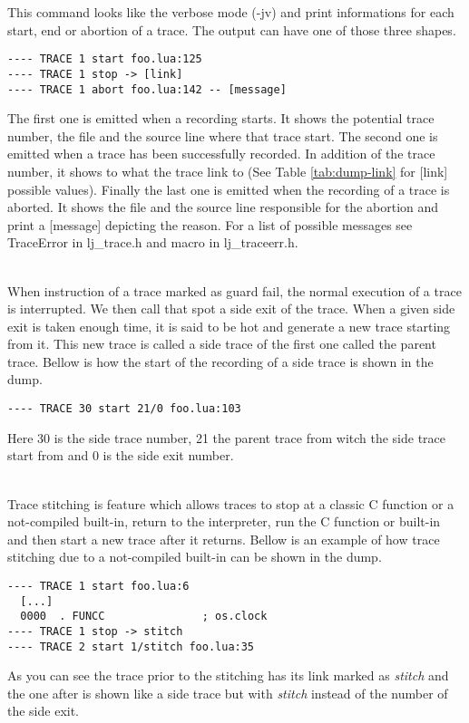 This command looks like the verbose mode (-jv) and print informations for each start,
end or abortion of a trace. The output can have one of those three shapes.
\begin{verbatim}
---- TRACE 1 start foo.lua:125
---- TRACE 1 stop -> [link]
---- TRACE 1 abort foo.lua:142 -- [message]
\end{verbatim}
The first one is emitted when a recording starts. It shows the potential
trace number, the file and the source line where that trace start.
The second one is emitted when a trace has been successfully recorded. In
addition of the trace number, it shows to what the trace link to (See Table
\ref{tab:dump-link} for [link] possible values). Finally the last one is emitted
when the recording of a trace is aborted. It shows the file and the source line
responsible for the abortion and print a [message] depicting the reason. For
a list of possible messages see TraceError in lj\_trace.h and macro in
lj\_traceerr.h.

\\
When instruction of a trace marked as guard fail, the normal execution of a
trace is interrupted. We then call that spot a side exit of the trace. When a
given side exit is taken enough time, it is said to be hot and generate a new
trace starting from it. This new trace is called a side trace of the first one
called the parent trace. Bellow is how the start of the recording of a side
trace is shown in the dump.
\begin{verbatim}
---- TRACE 30 start 21/0 foo.lua:103
\end{verbatim}
Here 30 is the side trace number, 21 the parent trace from witch the side trace
start from and 0 is the side exit number.

\\
Trace stitching is feature which allows traces to stop at a classic C function
or a not-compiled built-in, return to the interpreter, run the C function or
built-in and then start a new trace after it returns. Bellow is an example of
how trace stitching due to a not-compiled built-in can be shown in the dump.
\begin{verbatim}
---- TRACE 1 start foo.lua:6
  [...]
  0000  . FUNCC               ; os.clock
---- TRACE 1 stop -> stitch
---- TRACE 2 start 1/stitch foo.lua:35
\end{verbatim}
As you can see the trace prior to the stitching has its link marked as
\emph{stitch} and the one after is shown like a side trace but with
\emph{stitch} instead of the number of the side exit.

